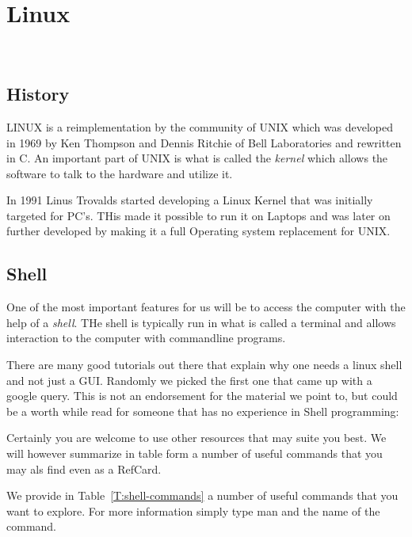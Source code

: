 
\chapter{Linux}
\label{C:linux}

\FILENAME\

\section{History}

LINUX is a reimplementation by the community of UNIX which was
developed in 1969 by Ken Thompson and Dennis Ritchie of Bell
Laboratories and rewritten in C. An important part of UNIX is what is
called the \textit{kernel} which allows the software to talk to
the hardware and utilize it. 

In 1991 Linus Trovalds started developing a Linux Kernel that was
initially targeted for PC's. THis made it possible to run it on
Laptops and was later on further developed by making it a full
Operating system replacement for UNIX. 

\section{Shell}
\label{c:linux-commands}

One of the most important features for us will be to access the
computer with the help of a \textit{shell}. THe shell is typically run in
what is called a terminal and allows interaction to the computer with
commandline programs. 

There are many good tutorials out there that explain why one needs a
linux shell and not just a GUI. Randomly we picked the first one that
came up with a google query. This is not an endorsement for the material
we point to, but could be a worth while read for someone that has no
experience in Shell programming:


Certainly you are welcome to use other resources that may suite you
best. We will however summarize in table form a number of useful
commands that you may als find even as a RefCard.


We provide in Table~\ref{T:shell-commands} a number of useful commands
that you want to explore. For more information simply type man and the
name of the command.


